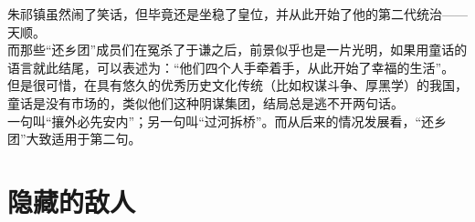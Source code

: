 \begin{multicols}{\theparacolNo}
朱祁镇虽然闹了笑话，但毕竟还是坐稳了皇位，并从此开始了他的第二代统治——天顺。\\

而那些“还乡团”成员们在冤杀了于谦之后，前景似乎也是一片光明，如果用童话的语言就此结尾，可以表述为：“他们四个人手牵着手，从此开始了幸福的生活”。\\

但是很可惜，在具有悠久的优秀历史文化传统（比如权谋斗争、厚黑学）的我国，童话是没有市场的，类似他们这种阴谋集团，结局总是逃不开两句话。\\

一句叫“攘外必先安内”；另一句叫“过河拆桥”。而从后来的情况发展看，“还乡团”大致适用于第二句。\\
\ifnum{}
	\end{multicols}
\fi
\newpage
\section{隐藏的敌人}
\ifnum{}
